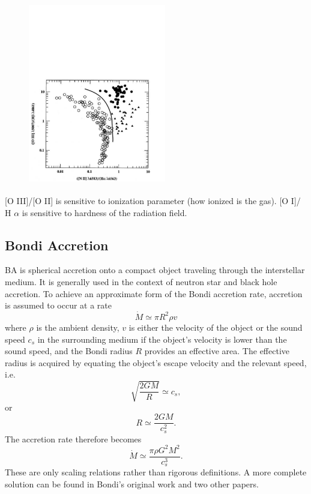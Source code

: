 \documentclass[11pt]{article}
\begin{document}
\begin{figure}
  \includegraphics[height=8.0cm,width=6.0cm]
  {BPT.pdf}
  \caption[]{}
\end{figure}
[O III]/[O II] is sensitive to ionization parameter (how ionized is the gas).
[O I]/ H $\alpha$ is sensitive to hardness of the radiation field. 

\subsection*{Bondi Accretion}
BA is spherical accretion onto a compact object traveling through
the interstellar medium. It is generally used in the context of
neutron star and black hole accretion. To achieve an approximate form
of the Bondi accretion rate, accretion is assumed to occur at a rate
\begin{equation}
  \dot {M}\simeq \pi R^{2}\rho v
\end{equation}
where $\rho$ is the ambient density, $v$ is either the velocity of the
object or the sound speed $ c_{s}$ in the surrounding medium if the
object's velocity is lower than the sound speed, and the Bondi radius
$R$ provides an effective area. The effective radius is acquired by
equating the object's escape velocity and the relevant speed, i.e.
\begin{equation}
  \sqrt{\frac{2 G M}{R}} \simeq c_s, 
\end{equation}
or
\begin{equation}
  R\simeq\frac{2 G M}{c_s^2}.
\end{equation}
The accretion rate therefore becomes
\begin{equation}
\dot {M} \simeq \frac{\pi \rho G^{2}M^{2}}{c_{s}^{3}} .
\end{equation}
These are only scaling relations rather than rigorous definitions. A
more complete solution can be found in Bondi's original work and two
other papers.
\end{document}
